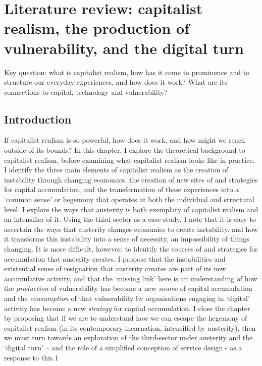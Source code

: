 \chapter{Literature review: capitalist realism, the production of vulnerability, and the digital turn}
\label{2}

Key question: what is capitalist realism, how has it come to prominence and to structure our everyday experiences, and how does it work? What are its connections to capital, technology and vulnerability?

\section{Introduction}
\label{2-intro}


If capitalist realism is so powerful, how does it work, and how might we reach outside of its bounds? In this chapter, I explore the theoretical background to capitalist realism, before examining what capitalist realism looks like in practice. I identify the three main elements of capitalist realism as the creation of instability through changing economics, the creation of new sites of and strategies for capital accumulation, and the transformation of these experiences into a `common sense' or hegemony that operates at both the individual and structural level. I explore the ways that austerity is both exemplary of capitalist realism and an intensifier of it. Using the third-sector as a case study, I note that it is easy to ascertain the ways that austerity
changes economics to create instability, and how it transforms this instability into a sense of necessity, an impossibility of things changing. It is more difficult, however, to identify the sources of and strategies for accumulation that austerity creates. I propose that the instabilities and existential sense of resignation that austerity creates are part of its new accumulative activity, and that the `missing link' here is an understanding of how the \emph{production} of vulnerability has become a new \emph{source} of capital accumulation and the \emph{consumption} of that vulnerability by organisations engaging in `digital' activity has become a new \emph{strategy} for capital accumulation. I close the chapter by proposing that if we are to understand how we can escape the hegemony of capitalist realism (in its contemporary incarnation, intensified by austerity), then we must turn towards an exploration of the third-sector under austerity and the `digital turn' -- and the role of a simplified conception of service design - as a response to this.1

